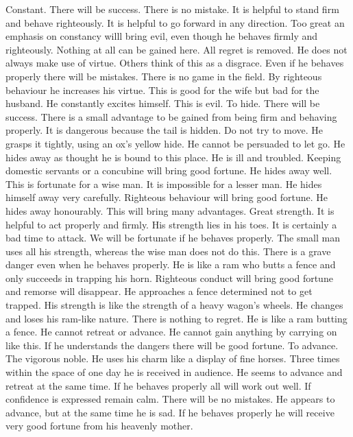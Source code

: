 	{Constant. There will be success. There is no mistake. It is helpful to stand firm and behave righteously.
		It is helpful to go forward in any direction.}
	{Too great an emphasis on constancy willl bring evil, even though he behaves firmly and righteously. Nothing
		at all can be gained here.}
	{All regret is removed.}
	{He does not always make use of virtue. Others think of this as a disgrace. Even if he behaves properly
		there will be mistakes.}
	{There is no game in the field.}
	{By righteous behaviour he increases his virtue. This is good for the wife but bad for the husband.}
	{He constantly excites himself. This is evil.}
\or {}
	{To hide. There will be success. There is a small advantage to be gained from being firm and behaving properly.}
	{It is dangerous because the tail is hidden. Do not try to move.}
	{He grasps it tightly, using an ox's yellow hide. He cannot be persuaded to let go.}
	{He hides away as thought he is bound to this place. He is ill and troubled. Keeping domestic servants or a
		concubine will bring good fortune.}
	{He hides away well. This is fortunate for a wise man. It is impossible for a lesser man.}
	{He hides himself away very carefully. Righteous behaviour will bring good fortune.}
	{He hides away honourably. This will bring many advantages.}
\or {}
	{Great strength. It is helpful to act properly and firmly.}
	{His strength lies in his toes. It is certainly a bad time to attack.}
	{We will be fortunate if he behaves properly.}
	{The small man uses all his strength, whereas the wise man does not do this. There is a grave danger even
		when he behaves properly. He is like a ram who butts a fence and only succeeds in trapping his horn.}
	{Righteous conduct will bring good fortune and remorse will disappear. He approaches a fence determined
			not to get trapped. His strength is like the strength of a heavy wagon's wheels.}
	{He changes and loses his ram-like nature. There is nothing to regret.}
	{He is like a ram butting a fence. He cannot retreat or advance. He cannot gain anything by carrying on like
		this. If he understands the dangers there will be good fortune.}
\or {}
	{To advance. The vigorous noble. He uses his charm like a display of fine horses. Three times within the
		space of one day he is received in audience.}
	{He seems to advance and retreat at the same time. If he behaves properly all will work out well. If
		confidence is expressed remain calm. There will be no mistakes.}
	{He appears to advance, but at the same time he is sad. If he behaves properly he will receive very good
		fortune from his heavenly mother.}
